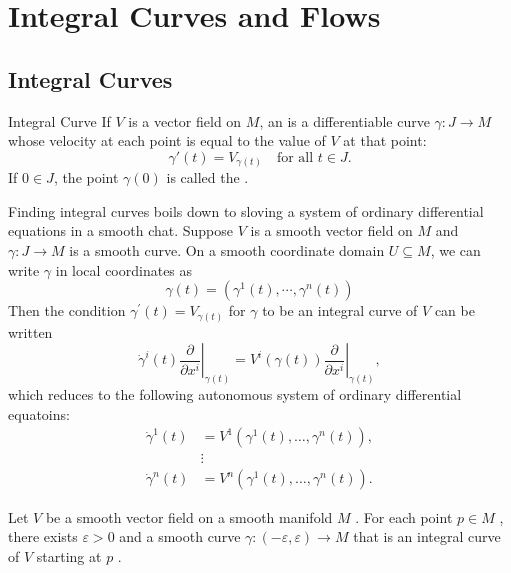 \documentclass[../main.tex]{subfiles}
\begin{document}
\ifSubfilesClassLoaded{

    \tableofcontents
    
}{}

\chapter{ Integral Curves and Flows }

\section{Integral Curves}

\begin{definition}{Integral Curve}{}
    If $V$ is a vector field on $M$, an  is a differentiable curve $\gamma: J \to M$ whose velocity at each point is equal to the value of $V$ at that point:
$$\gamma'(t) = V_{\gamma(t)} \quad \text{for all } t \in J.$$
If $0 \in J$, the point $\gamma(0)$ is called the . 
\end{definition}

Finding integral curves boils down to sloving a system of ordinary differential equations in a smooth chat. Suppose \(  V  \) is a smooth vector field on \(  M  \) and \(   \gamma :J\to M  \) is a smooth curve. On a smooth coordinate domain \(  U\subseteq M  \), we can write \(   \gamma   \) in local coordinates as  \[
 \gamma \left( t \right)= \left(  \gamma ^{1}\left( t \right),\cdots , \gamma ^{n}\left( t \right)   \right)  
\]     Then the condition \(   \gamma ^{\prime} \left( t \right)= V_{ \gamma \left( t \right) }   \) for \(   \gamma   \) to be an integral curve of \(  V  \) can be written \[
 \dot{\gamma}^{i}\left( t \right) \left. \frac{\partial }{\partial x^{i}} \right|_{ \gamma \left( t \right) }=   V^{i}\left(  \gamma \left( t \right)  \right)\left. \frac{\partial }{\partial x^{i}} \right|_{ \gamma \left( t \right) } , 
\]  which reduces to the following autonomous system of ordinary differential equatoins:  
\[
\begin{aligned}
\dot{\gamma}^1(t) &= V^1(\gamma^1(t), \dots, \gamma^n(t)), \\
&\vdots \\
\dot{\gamma}^n(t) &= V^n(\gamma^1(t), \dots, \gamma^n(t)).
\end{aligned}
\]

\begin{proposition}{}{}
    Let \(  V  \) be a smooth vector field on a smooth manifold \(  M  \) . For each point \(  p \in M  \) , there exists \(   \varepsilon > 0  \) and a smooth curve \(   \gamma : \left( - \varepsilon , \varepsilon  \right)\to M   \) that is an integral curve of \(  V  \) starting at \(  p  \) .        
\end{proposition}
\end{document}
